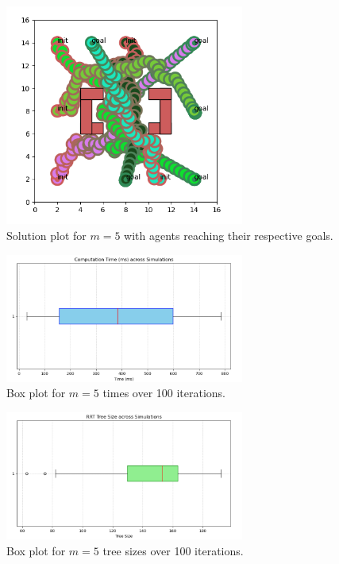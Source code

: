 \documentclass{article}
\begin{document}
\begin{figure}[H]
    \centering
    \includegraphics[width=0.7\textwidth]{1b5plot.png} 
    \caption{Solution plot for \(m = 5\) with agents reaching their respective goals.}
    \label{fig:1b5plot}
\end{figure}

\begin{figure}[H]
    \centering
    \includegraphics[width=0.7\textwidth]{1c5time.png} 
    \caption{Box plot for \(m = 5\) times over 100 iterations.}
    \label{fig:ic5time}
\end{figure}

\begin{figure}[H]
    \centering
    \includegraphics[width=0.7\textwidth]{1c5size.png} 
    \caption{Box plot for \(m = 5\) tree sizes over 100 iterations.}
    \label{fig:ic5size}
\end{figure}
\end{document}
